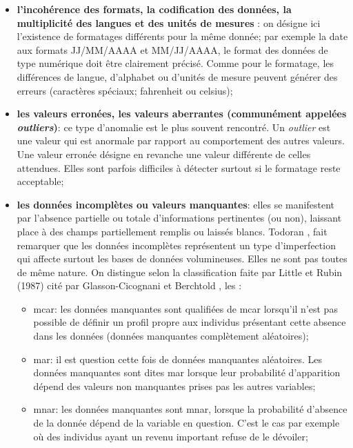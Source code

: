 \begin{itemize}[parsep=0cm,itemsep=0cm]
\item \textbf{l'incohérence des formats, la codification des donn\'ees, la multiplicit\'e des langues et des unit\'es de mesures} : on d\'esigne ici l'existence de formatages diff\'erents pour la m\^eme donn\'ee; par exemple la date aux formats JJ/MM/AAAA et MM/JJ/AAAA, le format des donn\'ees de type num\'erique doit \^etre clairement pr\'ecis\'e. Comme pour le formatage, les différences de langue, d'alphabet ou d'unités de mesure peuvent g\'en\'erer des erreurs (caractères sp\'eciaux;  fahrenheit ou celsius);

\item \textbf{les valeurs erronées, les valeurs aberrantes (commun\'ement appel\'ees \textit{outliers})}: ce type d'anomalie est le plus souvent rencontré. Un \textit{outlier} est une valeur qui est anormale par rapport au comportement des autres valeurs. Une valeur erronée d\'esigne en revanche une valeur diff\'erente de celles attendues. Elles sont parfois difficiles \`a d\'etecter surtout si le formatage reste acceptable;

\item \textbf{les donn\'ees incompl\`etes ou valeurs manquantes}: elles se manifestent par l'absence partielle ou totale d'informations pertinentes (ou non), laissant place \`a des champs partiellement remplis ou laiss\'es blancs. Todoran \cite{todoran}, fait remarquer que les données incomplètes repr\'esentent un type d'imperfection qui affecte surtout les bases de données volumineuses. Elles ne sont pas toutes de même nature. On distingue selon la classification faite par Little et Rubin (1987) cit\'e par Glasson-Cicognani et Berchtold \cite{glassoncicognani}, les :
\begin{itemize}[parsep=0cm,itemsep=0cm]
\item \acrfull{mcar}: les donn\'ees manquantes sont qualifi\'ees de \acrshort{mcar}  lorsqu'il n'est pas possible de d\'efinir un profil propre aux individus pr\'esentant cette absence dans les donn\'ees (donn\'ees manquantes complètement aléatoires);
\item \acrfull{mar}:  il est question cette fois de donn\'ees manquantes al\'eatoires. Les donn\'ees manquantes sont dites \acrshort{mar} lorsque leur probabilit\'e d'apparition d\'epend des valeurs non manquantes prises pas les autres variables;
\item \acrfull{mnar}: les donn\'ees manquantes sont \acrshort{mnar}, lorsque la probabilit\'e d'absence de la donn\'ee d\'epend de la variable en question. C'est le cas par exemple où des individus ayant un revenu important refuse de le d\'evoiler;
\end{itemize}


\end{itemize}
